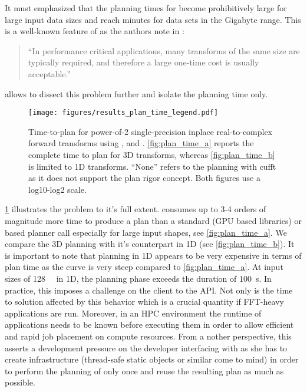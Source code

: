 It must emphasized that the planning times for  become prohibitively large for large input data sizes and reach minutes for data sets in the Gigabyte range. This is a well-known feature of \fftw{} as the authors note in \cite{FFTW05}:
%
\begin{quote}
  ``In performance critical applications, many transforms of the same
  size are typically required, and therefore a large one-time cost is
  usually acceptable.''
\end{quote}
% 
\gearshifft{} allows to dissect this problem further and isolate the planning time only.
%
\begin{figure}[!tbp]
  \centering
  \texttt{[image: figures/results\_plan\_time\_legend.pdf]}\vspace{-1em}
  \hfill
  \caption{Time-to-plan for power-of-2 single-precision inplace real-to-complex forward transforms using \fftw{}, \cufft{} and \clfft{}. \cref{fig:plan_time_a} reports the complete time to plan for 3D transforms, whereas \cref{fig:plan_time_b} is limited to 1D transforms. ``None'' refers to the planning with cufft as it does not support the plan rigor concept. Both figures use a log10-log2 scale.}
  \label{fig:plan_time}
\end{figure}
%
\cref{fig:plan_time} illustrates the problem to it's full extent.  consumes up to 3-4 orders of magnitude more time to produce a plan than a standard (GPU based libraries) or  based planner call especially for large input shapes, see \cref{fig:plan_time_a}. We compare the 3D planning with it's counterpart in 1D (see \cref{fig:plan_time_b}). It is important to note that \fftw{} planning in 1D appears to be very expensive in terms of plan time as the  curve is very steep compared to \cref{fig:plan_time_a}. At input sizes of \SI{128}{\mebi\byte} in 1D, the planning phase exceeds the duration of \SI{100}{\second}. In practice, this imposes a challenge on the client to the \fftw{} API. Not only is the time to solution affected by this behavior which is a crucial quantity if FFT-heavy applications are run. Moreover, in an HPC environment the runtime of applications needs to be known before executing them in order to allow efficient and rapid job placement on compute resources. From a nother perspective, this asserts a development pressure on the developer interfacing with \fftw{} as she has to create infrastructure (thread-safe static objects or similar come to mind) in order to perform the planning of \fftw{} only once and reuse the resulting plan as much as possible.

